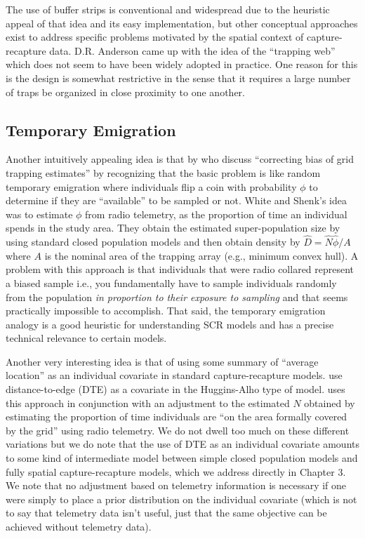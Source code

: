 The use of buffer strips is conventional and widespread due to the
heuristic appeal of that idea and its easy implementation, but other
conceptual approaches exist to address specific problems motivated by
the spatial context of capture-recapture data. D.R. Anderson came up
with the idea of the ``trapping web'' \citep{anderson_etal:1983} which
does not seem to have been widely adopted in practice.
One reason for this is 
the design is somewhat restrictive in the sense that it requires
a large number of traps be organized in close proximity to one
another.

\subsection{Temporary Emigration}

 Another intuitively appealing idea is that by
\citet{white_shenk:2000} who discuss ``correcting bias of grid
trapping estimates'' by recognizing that the basic problem is like
random temporary emigration \citep{kendall_nichols:1997}  where individuals flip a coin with
probability $\phi$ to determine if they are ``available'' to be sampled or not.
White and Shenk's idea was to estimate $\phi$ from radio telemetry, as the
proportion of time an individual spends in the study area. They obtain
the estimated super-population size by using standard closed
population models and then obtain density by $\hat{D} =
\hat{N}\hat{\phi}/A$ where $A$ is the nominal area of the trapping array
(e.g., minimum convex hull).  A problem with this approach is that 
individuals
that were radio collared represent a biased sample i.e.,
you fundamentally have to sample individuals randomly from the
population {\it in proportion to their exposure to sampling}
 and that seems practically impossible to accomplish.
That said, the temporary emigration
analogy is a good heuristic for understanding SCR models and has a
precise technical relevance to certain models.

Another very interesting idea is that of using some summary of
``average location'' as an individual covariate in standard
capture-recapture models. \citet{boulanger_mclellan:2001} use
distance-to-edge (DTE) as a covariate in the Huggins-Alho type of
model. \citet{ivan:2012} uses this approach in conjunction with an
adjustment to the estimated $N$ obtained by estimating the proportion of
time individuals are ``on the area formally covered by the grid''
using radio telemetry.  We do not dwell too much on these different
variations but we do note that the use of DTE as an individual
covariate amounts to some kind of intermediate model between simple
closed population models and fully spatial capture-recapture models,
which we address directly in Chapter 3. We note that no adjustment
based on telemetry information is necessary if one were simply to
place a prior distribution on the individual covariate (which is not
to say that telemetry data isn't useful, just that the same objective
can be achieved without telemetry data).

